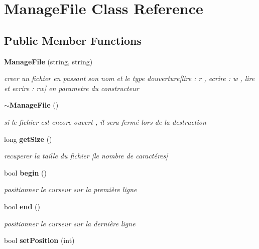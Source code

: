 \section{Manage\+File Class Reference}
\label{class_manage_file}
\subsection*{Public Member Functions}
\begin{DoxyCompactItemize}
\item 
{\bf Manage\+File} (string, string)\label{class_manage_file_a4518fd47f265a8fdf7390f4e3a379f48}

\begin{DoxyCompactList}\small\item\em creer un fichier en passant son nom et le type d\textquotesingle{}ouverture[lire \+: r , ecrire \+: w , lire et ecrire \+: rw] en parametre du constructeur \end{DoxyCompactList}\item 
{\bf $\sim$\+Manage\+File} ()\label{class_manage_file_a9e51cbd6892b25c9db2693a45b3b426a}

\begin{DoxyCompactList}\small\item\em si le fichier est encore ouvert , il sera fermé lors de la destruction \end{DoxyCompactList}\item 
long {\bf get\+Size} ()\label{class_manage_file_abc31b87fa59ce977343415c6f31aed91}

\begin{DoxyCompactList}\small\item\em recuperer la taille du fichier [le nombre de caractéres] \end{DoxyCompactList}\item 
bool {\bf begin} ()\label{class_manage_file_ac779e525496629ade46b98614d81e232}

\begin{DoxyCompactList}\small\item\em positionner le curseur sur la première ligne \end{DoxyCompactList}\item 
bool {\bf end} ()\label{class_manage_file_abecdb462684f3fa27d51a8a6a1916583}

\begin{DoxyCompactList}\small\item\em positionner le curseur sur la dernière ligne \end{DoxyCompactList}\item 
bool {\bf set\+Position} (int)\label{class_manage_file_a8fc25ce213e0cdfd7cb1c317a1bc9f9e}


\end{DoxyCompactItemize}
